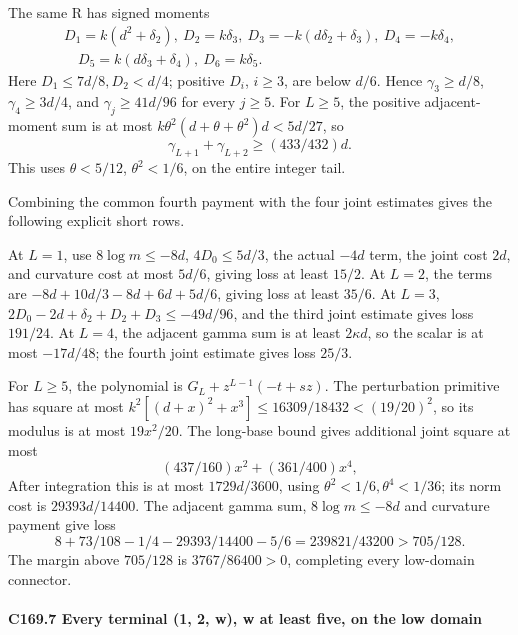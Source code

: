 The same R has signed moments
\[
\begin{gathered}
D_1=k(d^2+\delta_2),\ D_2=k\delta_3,\ D_3=-k(d\delta_2+\delta_3),\ D_4=-k\delta_4,\\
\quad D_5=k(d\delta_3+\delta_4),\ D_6=k\delta_5.
\end{gathered}\tag{C169.6.2}
\]
Here \(D_1\le7d/8,\allowbreak \allowbreak  D_2<d/4\); positive \(D_i\), \(i\ge3\), are below \(d/6\). Hence \(\gamma_3\ge d/8\), \(\gamma_4\ge3d/4\), and \(\gamma_j\ge41d/96\) for every \(j\ge5\). For \(L\ge5\), the positive adjacent-moment sum is at most \(k\theta^2(d+\theta+\theta^2)d<5d/27\), so
\[
\gamma_{L+1}+\gamma_{L+2}\ge(433/432)d.                   \tag{C169.6.3}
\]
This uses \(\theta<5/12\), \(\theta^2<1/6\), on the entire integer tail.

Combining the common fourth payment with the four joint estimates gives the following explicit short rows.

At \(L=1\), use \(8\log m\le-8d\), \(4D_0\le5d/3\), the actual \(-4d\) term, the joint cost \(2d\), and curvature cost at most \(5d/6\), giving loss at least \(15/2\). At \(L=2\), the terms are \(-8d+10d/3-8d+6d+5d/6\), giving loss at least \(35/6\). At \(L=3\), \(2D_0-2d+\delta_2+D_2+D_3\le-49d/96\), and the third joint estimate gives loss \(191/24\). At \(L=4\), the adjacent gamma sum is at least \(2\kappa d\), so the scalar is at most \(-17d/48\); the fourth joint estimate gives loss \(25/3\).

For \(L\ge5\), the polynomial is \(G_L+z^{L-1}(-t+sz)\). The perturbation primitive has square at most \(k^2[(d+x)^2+x^3]\le16309/18432<(19/20)^2\), so its modulus is at most \(19x^2/20\). The long-base bound gives additional joint square at most
\[
(437/160)x^2+(361/400)x^4,
\]
After integration this is at most \(1729d/3600\), using \(\theta^2<1/6,\allowbreak \allowbreak  \theta^4<1/36\); its norm cost is \(29393d/14400\). The adjacent gamma sum, \(8\log m\le-8d\) and curvature payment give loss
\[
8+73/108-1/4-29393/14400-5/6=239821/43200>705/128.         \tag{C169.6.4}
\]
The margin above \(705/128\) is \(3767/86400>0\), completing every low-domain connector.

\paragraph{C169.7 Every terminal (1, 2, w), w at least five, on the low domain}

